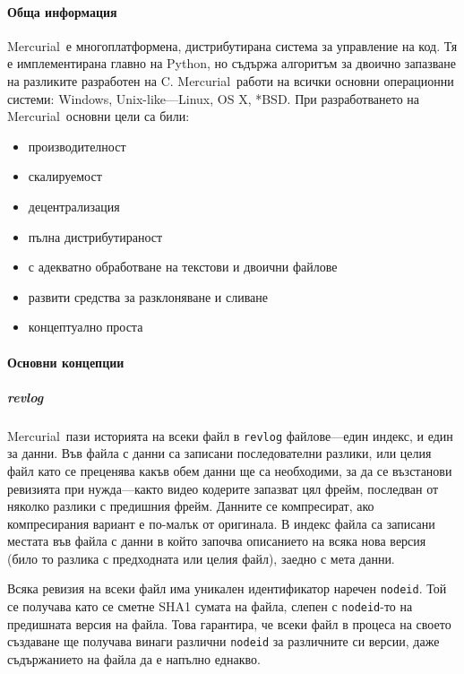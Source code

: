 \documentclass[a4paper]{article}
\def\Hg{Mercurial}
\begin{document}
    \paragraph{Обща информация}
    \Hg\ е многоплатформена, дистрибутирана система за управление на код. Тя
    е имплементирана главно на Python, но съдържа алгоритъм за двоично
    запазване на разликите разработен на C. \Hg\ работи на всички основни
    операционни системи: Windows, Unix-like---Linux, OS X, *BSD. При
    разработването на \Hg\ основни цели са били:
    \begin{itemize}
      \item производителност
      \item скалируемост
      \item децентрализация
      \item пълна дистрибутираност
      \item с адекватно обработване на текстови и двоични файлове
      \item развити средства за разклоняване и сливане
      \item концептуално проста
    \end{itemize}

    \paragraph{Основни концепции}
    \subparagraph{revlog}
    \Hg\ пази историята на всеки файл в \texttt{revlog} файлове---един индекс,
    и един за данни. Във файла с данни са записани последователни разлики, или
    целия файл като се преценява какъв обем данни ще са необходими, за да се
    възстанови ревизията при нужда---както видео кодерите запазват цял фрейм,
    последван от няколко разлики с предишния фрейм. Данните се компресират, ако
    компресирания вариант е по-малък от оригинала. В индекс файла са записани
    местата във файла с данни в който започва описанието на всяка нова версия
    (било то разлика с предходната или целия файл), заедно с мета данни.

    Всяка ревизия на всеки файл има уникален идентификатор наречен
    \texttt{nodeid}. Той се получава като се сметне SHA1\cite{sha1} сумата на файла,
    слепен с \texttt{nodeid}-то на предишната версия на файла. Това гарантира,
    че всеки файл в процеса на своето създаване ще получава винаги различни
    \texttt{nodeid} за различните си версии, даже съдържанието на файла да
    е напълно еднакво.
    \vspace{5 mm}
\end{document}
